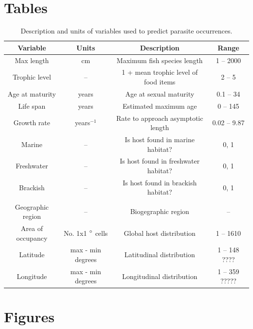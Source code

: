 \documentclass[12pt]{article}
\begin{document}




\newpage
\section*{Tables}
  \begin{table}[!h]
  \caption{Description and units of variables used to predict parasite occurrences.}
  \vspace{0.1cm}
  \begin{tabular}{cccc}
\hline
  \textbf{Variable} &   \textbf{Units} &   \textbf{Description} &   \textbf{Range} \\ 
\hline
Max length      & cm           & Maximum fish species length  & 1 -- 2000 \\ 
Trophic level   & --           & 1 + mean trophic level of food items   &  2 -- 5\\ 
Age at maturity & years        & Age at sexual maturity  & 0.1 -- 34  \\ 
Life span       & years        & Estimated maximum age & 0 -- 145  \\ 
Growth rate     & years$^{-1}$ & Rate to approach asymptotic length & 0.02 -- 9.87 \\ 
Marine          & --           & Is host found in marine habitat? & 0, 1  \\ 
Freshwater      & --           & Is host found in freshwater habitat? & 0, 1 \\ 
Brackish        & --           & Is host found in brackish habitat? & 0, 1 \\ 
 & & &  \\
Geographic region   & --      &   Biogegraphic region        & -- \\ 
Area of occupancy   & No. 1x1 $\degree$ cells &  Global host distribution  & 1 -- 1610    \\
Latitude            & max - min degrees & Latitudinal distribution      & 1 -- 148 ???? \\ 
Longitude           & max - min degrees & Longitudinal distribution         & 1 -- 359 ????? \\ 

\hline
  \end{tabular}
  \label{tab:traits}
\end{table}


   
   
   

\newpage
\section{Figures}
\end{document}
